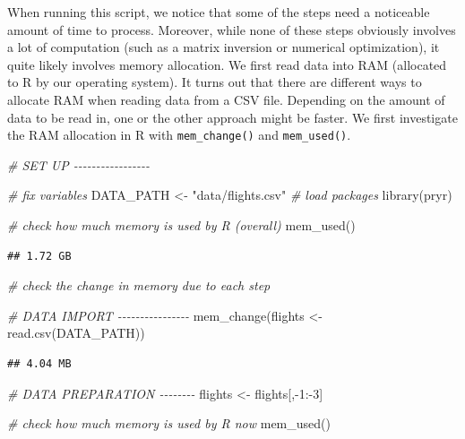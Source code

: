 \documentclass[
  12pt,
]{style/krantz}
\newenvironment{Shaded}{\begin{snugshade}}{\end{snugshade}}
\newcommand{\CommentTok}[1]{\textcolor[rgb]{0.56,0.35,0.01}{\textit{#1}}}
\newcommand{\DecValTok}[1]{\textcolor[rgb]{0.00,0.00,0.81}{#1}}
\newcommand{\FunctionTok}[1]{\textcolor[rgb]{0.00,0.00,0.00}{#1}}
\newcommand{\NormalTok}[1]{#1}
\newcommand{\OtherTok}[1]{\textcolor[rgb]{0.56,0.35,0.01}{#1}}
\newcommand{\SpecialCharTok}[1]{\textcolor[rgb]{0.00,0.00,0.00}{#1}}
\newcommand{\StringTok}[1]{\textcolor[rgb]{0.31,0.60,0.02}{#1}}
\begin{document}
When running this script, we notice that some of the steps need a noticeable amount of time to process. Moreover, while none of these steps obviously involves a lot of computation (such as a matrix inversion or numerical optimization), it quite likely involves memory allocation. We first read data into RAM (allocated to R by our operating system). It turns out that there are different ways to allocate RAM when reading data from a CSV file. Depending on the amount of data to be read in, one or the other approach might be faster. We first investigate the RAM allocation in R with \texttt{mem\_change()} and \texttt{mem\_used()}.

\begin{Shaded}
\begin{Highlighting}[]
\CommentTok{\# SET UP {-}{-}{-}{-}{-}{-}{-}{-}{-}{-}{-}{-}{-}{-}{-}{-}{-}}

\CommentTok{\# fix variables}
\NormalTok{DATA\_PATH }\OtherTok{\textless{}{-}} \StringTok{"data/flights.csv"}
\CommentTok{\# load packages}
\FunctionTok{library}\NormalTok{(pryr) }


\CommentTok{\# check how much memory is used by R (overall)}
\FunctionTok{mem\_used}\NormalTok{()}
\end{Highlighting}
\end{Shaded}

\begin{verbatim}
## 1.72 GB
\end{verbatim}

\begin{Shaded}
\begin{Highlighting}[]
\CommentTok{\# check the change in memory due to each step}

\CommentTok{\# DATA IMPORT {-}{-}{-}{-}{-}{-}{-}{-}{-}{-}{-}{-}{-}{-}{-}{-}}
\FunctionTok{mem\_change}\NormalTok{(flights }\OtherTok{\textless{}{-}} \FunctionTok{read.csv}\NormalTok{(DATA\_PATH))}
\end{Highlighting}
\end{Shaded}

\begin{verbatim}
## 4.04 MB
\end{verbatim}

\begin{Shaded}
\begin{Highlighting}[]
\CommentTok{\# DATA PREPARATION {-}{-}{-}{-}{-}{-}{-}{-}}
\NormalTok{flights }\OtherTok{\textless{}{-}}\NormalTok{ flights[,}\SpecialCharTok{{-}}\DecValTok{1}\SpecialCharTok{:{-}}\DecValTok{3}\NormalTok{]}

\CommentTok{\# check how much memory is used by R now}
\FunctionTok{mem\_used}\NormalTok{()}
\end{Highlighting}
\end{Shaded}
\end{document}
